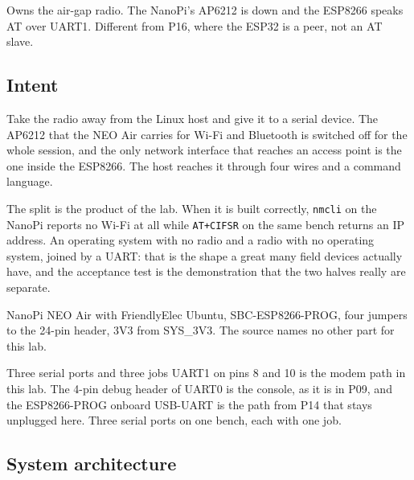 
\begin{unique}
Owns the air-gap radio. The NanoPi's AP6212 is down and the ESP8266 speaks AT over UART1. Different from P16, where the ESP32 is a peer, not an AT slave.
\end{unique}

\subsection*{Intent}

Take the radio away from the Linux host and give it to a serial device. The AP6212 that the NEO Air carries for Wi-Fi and Bluetooth is switched off for the whole session, and the only network interface that reaches an access point is the one inside the ESP8266. The host reaches it through four wires and a command language.

The split is the product of the lab. When it is built correctly, \texttt{nmcli} on the NanoPi reports no Wi-Fi at all while \texttt{AT+CIFSR} on the same bench returns an IP address. An operating system with no radio and a radio with no operating system, joined by a UART: that is the shape a great many field devices actually have, and the acceptance test is the demonstration that the two halves really are separate.

\begin{kit}
NanoPi NEO Air with FriendlyElec Ubuntu, SBC-ESP8266-PROG, four jumpers to the 24-pin header, 3V3 from SYS\_3V3. The source names no other part for this lab.
\end{kit}

\begin{note}{Three serial ports and three jobs}
UART1 on pins 8 and 10 is the modem path in this lab. The 4-pin debug header of UART0 is the console, as it is in P09, and the ESP8266-PROG onboard USB-UART is the path from P14 that stays unplugged here. Three serial ports on one bench, each with one job.
\end{note}

\subsection*{System architecture}


